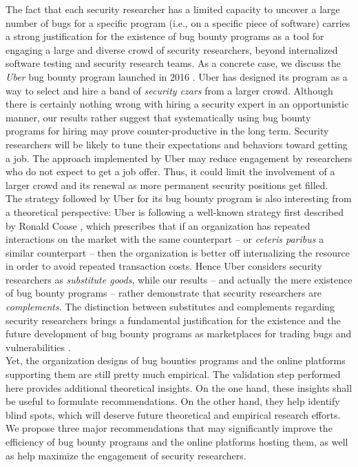 The fact that each security researcher has a limited capacity to uncover a large number of bugs for a specific program (i.e., on a specific piece of software) carries a strong justification for the existence of bug bounty programs as a tool for engaging a large and diverse crowd of security researchers, beyond internalized software testing and security research teams. As a concrete case, we discuss the {\it Uber} bug bounty program launched in 2016 \cite{moussouris2016}. Uber has designed its program as a way to select and hire a band of {\it security czars} from a larger crowd. Although there is certainly nothing wrong with hiring a security expert in an opportunistic manner, our results rather suggest that systematically using bug bounty programs for hiring may prove counter-productive in the long term. Security researchers will be likely to tune their expectations and behaviors toward getting a job. The approach implemented by Uber may reduce engagement by researchers who do not expect to get a job offer. Thus, it could limit the involvement of a larger crowd and its renewal as more permanent security positions get filled. \\

The strategy followed by Uber for its bug bounty program is also interesting from a theoretical perspective: Uber is following a well-known strategy first described by Ronald Coase \cite{coase1937}, which prescribes that if an organization has repeated interactions on the market with the same counterpart -- or {\it ceteris paribus} a similar counterpart -- then the organization is better off internalizing the resource in order to avoid repeated transaction costs. Hence Uber considers security researchers as {\it substitute goods}, while our results -- and actually the mere existence of bug bounty programs -- rather demonstrate that security researchers are {\it complements}. The distinction between substitutes and complements regarding security researchers brings a fundamental justification for the existence and the future development of bug bounty programs as marketplaces for trading bugs and vulnerabilities \cite{bohme2006comparison}. \\

Yet, the organization designs of bug bounties programs and the online platforms supporting them are still pretty much empirical. The validation step performed here provides additional theoretical insights. On the one hand, these insights shall be useful to formulate recommendations. On the other hand, they help identify blind spots, which will deserve future theoretical and empirical research efforts. We propose three major recommendations that may significantly improve the efficiency of bug bounty programs and the online platforms hosting them, as well as help maximize the engagement of security researchers. 

